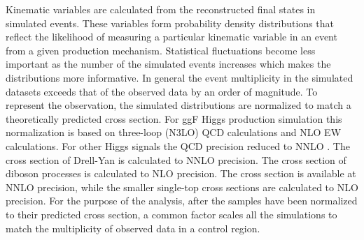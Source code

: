 Kinematic variables are calculated from the reconstructed final states in simulated events.
These variables form probability density distributions that reflect the likelihood of measuring a particular kinematic variable in an event from a given production mechanism.
Statistical fluctuations become less important as the number of the simulated events increases which makes the distributions more informative.
In general the event multiplicity in the simulated datasets exceeds that of the observed data by an order of magnitude.
To represent the observation, the simulated distributions are normalized to match a theoretically predicted cross section.
For ggF Higgs production simulation this normalization is based on three-loop (N3LO) QCD calculations and NLO EW calculations.
For other Higgs signals the QCD precision reduced to NNLO \cite{higgsCross}.
The cross section of Drell-Yan is calculated to NNLO precision.
The cross section of diboson processes is calculated to NLO precision.
The \ttbar cross section is available at NNLO precision, while the smaller single-top cross sections are calculated to NLO precision.
For the purpose of the \nr analysis, after the samples have been normalized to their predicted cross section, a common factor scales all the simulations to match the multiplicity of observed data in a control region. 



